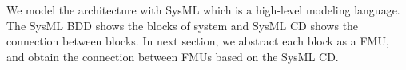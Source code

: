 \begin{figure}[htbp]
\end{figure}
We model the architecture with SysML which is a high-level modeling language. The SysML BDD shows the blocks of system and SysML CD shows the connection between blocks. In next section, we abstract each block as a FMU, and obtain the connection between FMUs based on the SysML CD.

